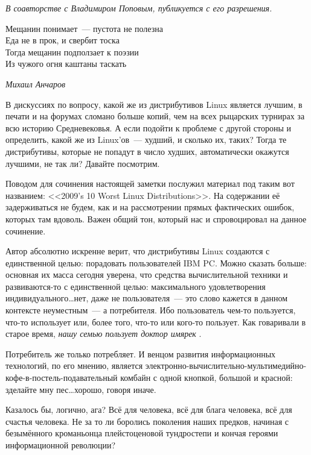 \textsl{В соавторстве с Владимиром Поповым, публикуется с его разрешения.}

\hfill \begin{minipage}[h]{0.45\textwidth}
Мещанин понимает~--- пустота не полезна \\
Еда не в прок, и свербит тоска \\
Тогда мещанин подползает к поэзии\\ 
Из чужого огня каштаны таскать
\begin{flushright}
\textit{Михаил Анчаров}
\end{flushright}
\bigskip\end{minipage}

В дискуссиях по вопросу, какой же из дистрибутивов Linux является лучшим, в печати и на форумах сломано больше копий, чем на всех рыцарских турнирах за всю историю Средневековья. А если подойти к проблеме с другой стороны и определить, какой же из Linux'ов~--- худший, и сколько их, таких? Тогда те дистрибутивы, которые не попадут в число худших, автоматически окажутся лучшими, не так ли? Давайте посмотрим.

Поводом для сочинения настоящей заметки послужил материал под таким вот названием: <<2009's 10 Worst Linux Distributions>>. На содержании её задерживаться не будем, как и на рассмотрении прямых фактических ошибок, которых там вдоволь. Важен общий тон, который нас и спровоцировал на данное сочинение.

Автор абсолютно искренне верит, что дистрибутивы Linux создаются с единственной целью: порадовать пользователей IBM PC. Можно сказать больше: основная их масса сегодня уверена, что средства вычислительной техники и развиваются-то с единственной целью: максимального удовлетворения индивидуального\dots нет, даже не пользователя~--- это слово кажется в данном контексте неуместным~--- а потребителя. Ибо пользователь чем-то пользуется, что-то использует или, более того, что-то или кого-то пользует. Как говаривали в старое время, 
\textit{нашу семью пользует доктор имярек}
.

Потребитель же только потребляет. И венцом развития информационных технологий, по его мнению, является электронно-вычислительно-мультимедийно-кофе-в-постель-подавательный комбайн с одной кнопкой, большой и красной: зделайте мну пес\dots хорошо, говоря иначе.

Казалось бы, логично, ага? Всё для человека, всё для блага человека, всё для счастья человека. Не за то ли боролись поколения наших предков, начиная с безымённого кроманьонца плейстоценовой тундростепи и кончая героями информационной революции?

